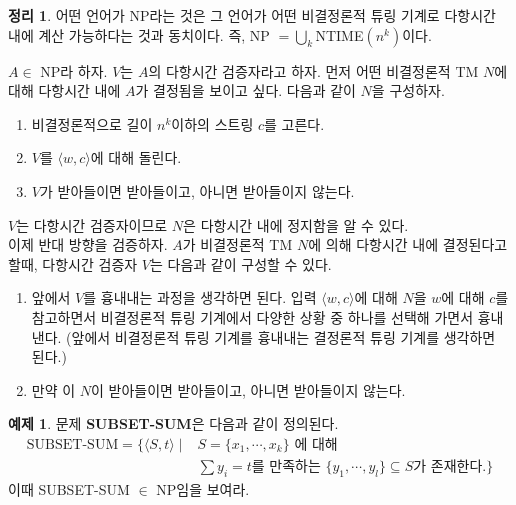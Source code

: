 \documentclass[b5paper, 10pt]{book}
\theoremstyle{definition}
\newtheorem{thm}[defn]{정리}
\newtheorem{ex}[defn]{예제}
\newenvironment{pf*}{\pushQED{\qed}\pf}{\popQED\endpf}
\begin{document}
\begin{thm}
    어떤 언어가 NP라는 것은 그 언어가 어떤 비결정론적 튜링 기계로 다항시간 내에 계산 가능하다는 것과 동치이다.
    즉, NP $= \bigcup_k$NTIME$(n^k)$이다.
\end{thm}
\begin{pf*}
    $A \in $ NP라 하자. $V$는 $A$의 다항시간 검증자라고 하자. 
    먼저 어떤 비결정론적 TM $N$에 대해 다항시간 내에 $A$가 결정됨을 보이고 싶다.
    다음과 같이 $N$을 구성하자.
    \begin{enumerate}
        \item 비결정론적으로 길이 $n^k$이하의 스트링 $c$를 고른다.
        \item $V$를 $\langle w,c \rangle$에 대해 돌린다.
        \item $V$가 받아들이면 받아들이고, 아니면 받아들이지 않는다. 
    \end{enumerate}
    $V$는 다항시간 검증자이므로 $N$은 다항시간 내에 정지함을 알 수 있다. \\ 
    이제 반대 방향을 검증하자. $A$가 비결정론적 TM $N$에 의해 다항시간 내에 결정된다고 할때, 다항시간
    검증자 $V$는 다음과 같이 구성할 수 있다.
    \begin{enumerate}
        \item 앞에서 $V$를 흉내내는 과정을 생각하면 된다. 입력 $\langle w,c \rangle$에 대해 $N$을 $w$에
        대해 $c$를 참고하면서 비결정론적 튜링 기계에서 다양한 상황 중 하나를 선택해 가면서 흉내낸다. (앞에서
        비결정론적 튜링 기계를 흉내내는 결정론적 튜링 기계를 생각하면 된다.) 
        \item 만약 이 $N$이 받아들이면 받아들이고, 아니면 받아들이지 않는다.
    \end{enumerate}
\end{pf*}
\begin{ex}
    문제 \textbf{SUBSET-SUM}은 다음과 같이 정의된다. 
    \begin{align*}
        \text{SUBSET-SUM} = \{\langle S, t \rangle \; \vert \; &S = \{x_1, \cdots , x_k\} \text{ 에 대해 }
        \\ &\sum y_i = t \text{를 만족하는 }\{y_1, \cdots, y_l \} \subseteq S  \text{가 존재한다.} \}
    \end{align*}
    이때 SUBSET-SUM $\in$ NP임을 보여라.
\end{ex}
\end{document}
